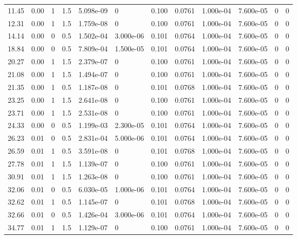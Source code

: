 \documentclass[preview]{standalone}
\begin{document}
{{\begin{tabular}{L{1.2cm}C{1.2cm} C{0.3cm}C{0.5cm} C{1.4cm}C{1.4cm} C{1.4cm}C{1.4cm} C{1.6cm}C{1.6cm} C{1.6cm}C{1.6cm}}
  11.45  &  0.00  & 1     & 1.5 &  5.098e-09  & 0  &  0.100&   0.0761& 1.000e-04 & 7.600e-05   &  0 & 0  \\ 
  12.31  &  0.00  & 1     & 1.5 &  1.759e-08  & 0  &  0.100&   0.0761& 1.000e-04 & 7.600e-05   &  0 & 0  \\ 
  14.14  &  0.00  & 0     & 0.5 &  1.502e-04  & 3.000e-06  &  0.101&   0.0764& 1.000e-04 & 7.600e-05   &  0 & 0  \\ 
  18.84  &  0.00  & 0     & 0.5 &  7.809e-04  & 1.500e-05  &  0.101&   0.0764& 1.000e-04 & 7.600e-05   &  0 & 0  \\ 
  20.27  &  0.00  & 1     & 1.5 &  2.379e-07  & 0  &  0.100&   0.0761& 1.000e-04 & 7.600e-05   &  0 & 0  \\ 
  21.08  &  0.00  & 1     & 1.5 &  1.494e-07  & 0  &  0.100&   0.0761& 1.000e-04 & 7.600e-05   &  0 & 0  \\ 
  21.35  &  0.00  & 1     & 0.5 &  1.187e-08  & 0  &  0.101&   0.0768& 1.000e-04 & 7.600e-05   &  0 & 0  \\ 
  23.25  &  0.00  & 1     & 1.5 &  2.641e-08  & 0  &  0.100&   0.0761& 1.000e-04 & 7.600e-05   &  0 & 0  \\ 
  23.71  &  0.00  & 1     & 1.5 &  2.531e-08  & 0  &  0.100&   0.0761& 1.000e-04 & 7.600e-05   &  0 & 0  \\ 
  24.33  &  0.00  & 0     & 0.5 &  1.199e-03  & 2.300e-05  &  0.101&   0.0764& 1.000e-04 & 7.600e-05   &  0 & 0  \\ 
  26.23  &  0.01  & 0     & 0.5 &  2.831e-04  & 5.000e-06  &  0.101&   0.0764& 1.000e-04 & 7.600e-05   &  0 & 0  \\ 
  26.59  &  0.01  & 1     & 0.5 &  3.591e-08  & 0  &  0.101&   0.0768& 1.000e-04 & 7.600e-05   &  0 & 0  \\ 
  27.78  &  0.01  & 1     & 1.5 &  1.139e-07  & 0  &  0.100&   0.0761& 1.000e-04 & 7.600e-05   &  0 & 0  \\ 
  30.91  &  0.01  & 1     & 1.5 &  1.263e-08  & 0  &  0.100&   0.0761& 1.000e-04 & 7.600e-05   &  0 & 0  \\ 
  32.06  &  0.01  & 0     & 0.5 &  6.030e-05  & 1.000e-06  &  0.101&   0.0764& 1.000e-04 & 7.600e-05   &  0 & 0  \\ 
  32.62  &  0.01  & 1     & 0.5 &  1.145e-07  & 0  &  0.101&   0.0768& 1.000e-04 & 7.600e-05   &  0 & 0  \\ 
  32.66  &  0.01  & 0     & 0.5 &  1.426e-04  & 3.000e-06  &  0.101&   0.0764& 1.000e-04 & 7.600e-05   &  0 & 0  \\ 
  34.77  &  0.01  & 1     & 1.5 &  1.129e-07  & 0  &  0.100&   0.0761& 1.000e-04 & 7.600e-05   &  0 & 0  \\ 

\end{tabular}}}
\end{document}
